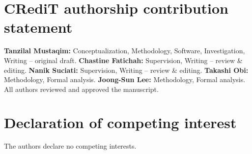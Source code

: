 \documentclass[preprint,review,12pt]{elsarticle}
\begin{document}
\section*{CRediT authorship contribution statement}
\textbf{Tanzilal Mustaqim:} Conceptualization, Methodology, Software,
Investigation, Writing -- original draft. \textbf{Chastine Fatichah:}
Supervision, Writing -- review \& editing. \textbf{Nanik Suciati:}
Supervision, Writing -- review \& editing. \textbf{Takashi Obi:}
Methodology, Formal analysis. \textbf{Joong-Sun Lee:} Methodology, Formal
analysis. All authors reviewed and approved the manuscript.

\section*{Declaration of competing interest}
The authors declare no competing interests.



\end{document}
